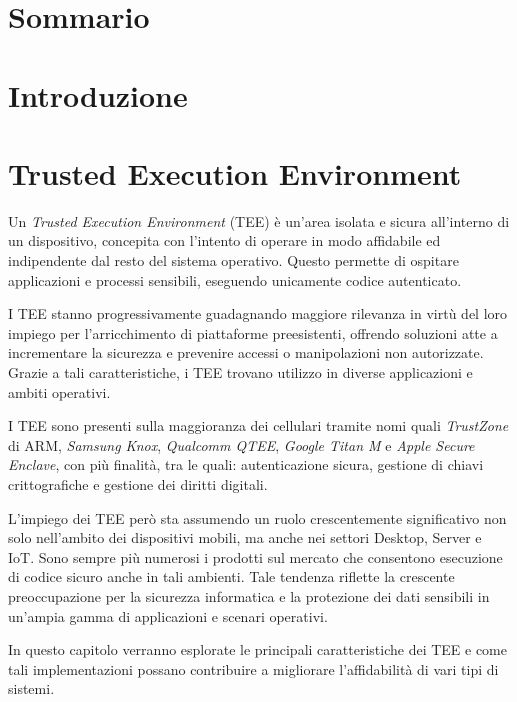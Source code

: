 \documentclass[12pt,italian]{report}
\begin{document}
	
	\frontespizio
	\afterpreface
	
	\chapter*{Sommario}
	\label{cap:sommario}
	
	\chapter{Introduzione}
	\label{sec:introduzione}
	
	\chapter{Trusted Execution Environment}
	\label{cap:TEE}
	Un \textit{Trusted Execution Environment} (TEE) è un'area isolata e sicura all'interno di un dispositivo, concepita con l'intento di operare in modo affidabile ed indipendente dal resto del sistema operativo. Questo permette di ospitare applicazioni e processi sensibili, eseguendo unicamente codice autenticato.
	
	I TEE stanno progressivamente guadagnando maggiore rilevanza in virtù del loro impiego per l'arricchimento di piattaforme preesistenti, offrendo soluzioni atte a incrementare la sicurezza e prevenire accessi o manipolazioni non autorizzate. Grazie a tali caratteristiche, i TEE trovano utilizzo in diverse applicazioni e ambiti operativi.
	
	\bigbreak
	
	I TEE sono presenti sulla maggioranza dei cellulari tramite nomi quali \textit{TrustZone} di ARM, \textit{Samsung Knox}, \textit{Qualcomm QTEE}, \textit{Google Titan M} e \textit{Apple Secure Enclave}, con più finalità, tra le quali: autenticazione sicura, gestione di chiavi crittografiche e gestione dei diritti digitali.
	
	L'impiego dei TEE però sta assumendo un ruolo crescentemente significativo non solo nell'ambito dei dispositivi mobili, ma anche nei settori Desktop, Server e IoT. Sono sempre più numerosi i prodotti sul mercato che consentono esecuzione di codice sicuro anche in tali ambienti. Tale tendenza riflette la crescente preoccupazione per la sicurezza informatica e la protezione dei dati sensibili in un'ampia gamma di applicazioni e scenari operativi.
	
	In questo capitolo verranno esplorate le principali caratteristiche dei TEE e come tali implementazioni possano contribuire a migliorare l'affidabilità di vari tipi di sistemi.
	
\end{document}
